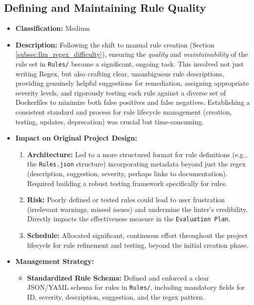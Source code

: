 \subsection{Defining and Maintaining Rule Quality}
\label{subsec:rule_quality_difficulty}
\begin{itemize}
    \item \textbf{Classification:} Medium
    \item \textbf{Description:} Following the shift to manual rule creation (Section \ref{subsec:llm_regex_difficulty}), ensuring the \textit{quality} and \textit{maintainability} of the rule set in \texttt{Rules/} became a significant, ongoing task. This involved not just writing Regex, but also crafting clear, unambiguous rule descriptions, providing genuinely helpful suggestions for remediation, assigning appropriate severity levels, and rigorously testing each rule against a diverse set of Dockerfiles to minimize both false positives and false negatives. Establishing a consistent standard and process for rule lifecycle management (creation, testing, updates, deprecation) was crucial but time-consuming.
    \item \textbf{Impact on Original Project Design:}
        \begin{enumerate}
            \item \textbf{Architecture:} Led to a more structured format for rule definitions (e.g., the \texttt{Rules.json} structure) incorporating metadata beyond just the regex (description, suggestion, severity, perhaps links to documentation). Required building a robust testing framework specifically for rules.
            \item \textbf{Risk:} Poorly defined or tested rules could lead to user frustration (irrelevant warnings, missed issues) and undermine the linter's credibility. Directly impacts the effectiveness measure in the \texttt{Evaluation Plan}.
            \item \textbf{Schedule:} Allocated significant, continuous effort throughout the project lifecycle for rule refinement and testing, beyond the initial creation phase.
        \end{enumerate}
    \item \textbf{Management Strategy:}
        \begin{itemize}
            \item \textbf{Standardized Rule Schema:} Defined and enforced a clear JSON/YAML schema for rules in \texttt{Rules/}, including mandatory fields for ID, severity, description, suggestion, and the regex pattern.

\end{itemize}
\end{itemize}
